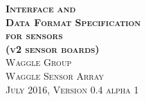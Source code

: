 \documentclass{article}
\begin{document}
\begin{titlepage}
   \begin{center}
        \Huge\textbf{\textsc{Interface and \\ Data Format Specification \\ for sensors \\
        \Large\textsc{(v2 sensor boards)}}}\\[0.5cm]
        \Large\textsc{Waggle Group \\ Waggle Sensor Array}\\[1cm]
        \large\textsc{July 2016, }
        \large\textsc{Version 0.4 alpha 1}\\
   \end{center}
\end{titlepage}

\tableofcontents
\newpage






\end{document}
